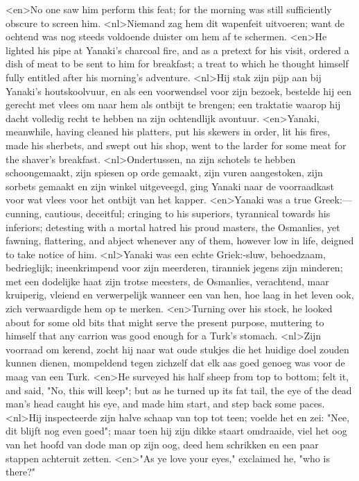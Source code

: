 <en>No one saw him perform this feat; for the morning was still sufficiently obscure to screen him.
<nl>Niemand zag hem dit wapenfeit uitvoeren; want de ochtend was nog steeds voldoende duister om hem af te schermen.
<en>He lighted his pipe at Yanaki's charcoal fire, and as a pretext for his visit, ordered a dish of meat to be sent to him for breakfast; a treat to which he thought himself fully entitled after his morning's adventure.
<nl>Hij stak zijn pijp aan bij Yanaki's houtskoolvuur, en als een voorwendsel voor zijn bezoek, bestelde hij een gerecht met vlees om naar hem als ontbijt te brengen; een traktatie waarop hij dacht   volledig recht te hebben  na zijn ochtendlijk avontuur.
<en>Yanaki, meanwhile, having cleaned his platters, put his skewers in order, lit his fires, made his sherbets, and swept out his shop, went to the larder for some meat for the shaver's breakfast.
<nl>Ondertussen, na zijn schotels te hebben schoongemaakt, zijn spiesen op orde gemaakt, zijn vuren aangestoken, zijn sorbets gemaakt en zijn winkel uitgeveegd, ging Yanaki naar de voorraadkast voor wat vlees voor het ontbijt van het kapper.
<en>Yanaki was a true Greek:—cunning, cautious, deceitful; cringing to his superiors, tyrannical towards his inferiors; detesting with a mortal hatred his proud masters, the Osmanlies, yet fawning, flattering, and abject whenever any of them, however low in life, deigned to take notice of him.
<nl>Yanaki was een echte Griek:-sluw, behoedzaam, bedrieglijk; ineenkrimpend voor zijn meerderen, tiranniek jegens zijn minderen;  met een dodelijke haat zijn trotse meesters, de Osmanlies, verachtend, maar kruiperig, vleiend en verwerpelijk wanneer een van hen, hoe laag in het leven ook, zich verwaardigde hem op te merken.
<en>Turning over his stock, he looked about for some old bits that might serve the present purpose, muttering to himself that any carrion was good enough for a Turk's stomach.
<nl>Zijn voorraad om kerend, zocht hij naar wat oude stukjes die het huidige doel zouden kunnen dienen,  mompeldend tegen zichzelf dat elk aas goed genoeg was voor de maag van een Turk.
<en>He surveyed his half sheep from top to bottom; felt it, and said, "No, this will keep"; but as he turned up its fat tail, the eye of the dead man's head caught his eye, and made him start, and step back some paces.
<nl>Hij inspecteerde zijn halve schaap van top tot teen; voelde het en zei: "Nee, dit blijft nog even goed"; maar toen hij zijn dikke staart omdraaide, viel het oog van het hoofd van dode man  op zijn oog, deed hem schrikken en  een paar stappen achteruit zetten.
<en>"As ye love your eyes," exclaimed he, "who is there?"
